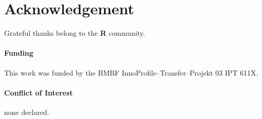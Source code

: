 \documentclass{bioinfo}
\begin{document}
\section*{Acknowledgement}
\begin{methods}
Grateful thanks belong to the \textbf{R} community.

\paragraph{Funding\textcolon} This work was funded by the BMBF InnoProfile--Transfer--Projekt 03 IPT 611X.

\paragraph{Conflict of Interest\textcolon} none declared.
\end{methods}


%
%
%
%
%
%
%

\end{document}
